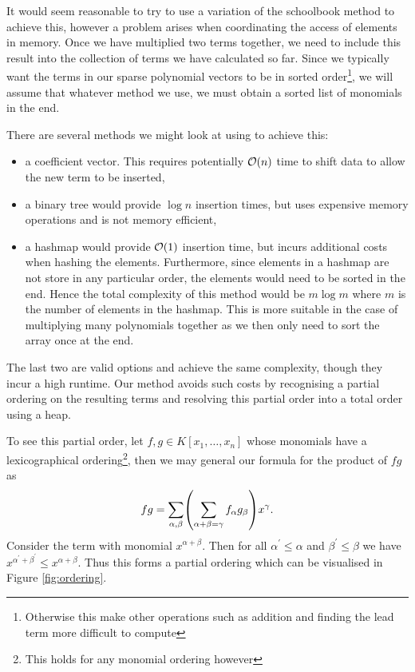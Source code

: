 It would seem reasonable to try to use a variation of the schoolbook method to achieve this, however a problem arises when coordinating the access of elements in memory. Once we have multiplied two terms together, we need to include this result into the collection of terms we have calculated so far. Since we typically want the terms in our sparse polynomial vectors to be in sorted order\footnote{Otherwise this make other operations such as addition and finding the lead term more difficult to compute}, we will assume that whatever method we use, we must obtain a sorted list of monomials in the end.

There are several methods we might look at using to achieve this:
\begin{itemize}
    \item a coefficient vector. This requires potentially $\mathcal O(n)$ time to shift data to allow the new term to be inserted,
    \item a binary tree would provide $\log n$ insertion times, but uses expensive memory operations and is not memory efficient, 
    \item a hashmap would provide $\mathcal O(1)$ insertion time, but incurs additional costs when hashing the elements. Furthermore, since elements in a hashmap are not store in any particular order, the elements would need to be sorted in the end. Hence the total complexity of this method would be $m \log m$ where $m$ is the number of elements in the hashmap. This is more suitable in the case of multiplying many polynomials together as we then only need to sort the array once at the end.
\end{itemize}

The last two are valid options and achieve the same complexity, though they incur a high runtime. Our method avoids such costs by recognising a partial ordering on the resulting terms and resolving this partial order into a total order using a heap.

To see this partial order, let $f, g \in K[x_1, \ldots, x_n]$ whose monomials have a lexicographical ordering\footnote{This holds for any monomial ordering however}, then we may general our formula for the product of $fg$ as
\[
    fg = \sum_{\alpha, \beta} \bb{\sum_{\alpha + \beta = \gamma}f_\alpha g_\beta} x^{\gamma}.
\]
Consider the term with monomial $x^{\alpha + \beta}$. Then for all $ \alpha^\prime \le \alpha$ and $\beta^\prime \le \beta$ we have $x^{\alpha^\prime + \beta^\prime} \le x^{\alpha + \beta}$. Thus this forms a partial ordering which can be visualised in Figure \ref{fig:ordering}.



